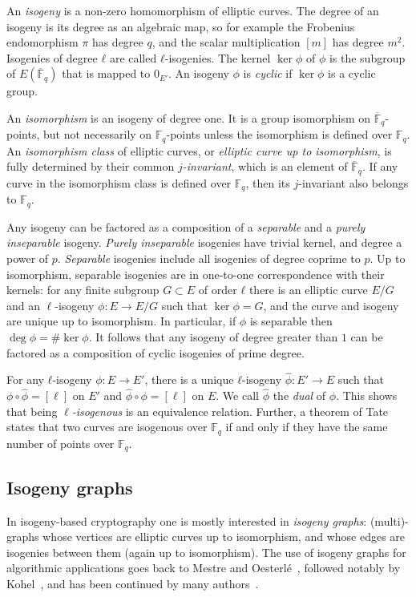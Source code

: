 \documentclass{llncs}
\newcommand{\F}{\mathbb{F}}
\newcommand{\Fbar}{\overline{\mathbb{F}}}
\begin{document}
An \emph{isogeny} is a non-zero homomorphism of elliptic curves.
The
degree of an isogeny is its degree as an algebraic map,
so for example the Frobenius endomorphism $\pi$ has degree $q$,
and the scalar multiplication $[m]$ has degree $m^2$.
Isogenies of degree $ℓ$ are called $ℓ$-isogenies.
The kernel $\ker ϕ$ of $\phi$
is the subgroup of $E(\Fbar_q)$ that is
mapped to $0_{E'}$. 
An isogeny $ϕ$ is \emph{cyclic} 
if $\ker ϕ$ is a cyclic group.

An \emph{isomorphism} is an isogeny of degree one. It is a
group isomorphism on $\Fbar_q$-points, but not necessarily on $\F_q$-points
unless the isomorphism is defined over $\F_q$. An \emph{isomorphism class}
of elliptic curves, or \emph{elliptic curve up to isomorphism}, is
fully determined by their common \emph{$j$-invariant}, which is an
element of $\Fbar_q$. If any curve in the isomorphism class is defined
over $\F_q$, then its $j$-invariant also belongs to $\F_q$.

Any isogeny can be factored as a composition of a \emph{separable} and
a \emph{purely inseparable} isogeny. \emph{Purely inseparable}
isogenies have trivial kernel, and degree a power of $p$.
\emph{Separable} isogenies include all
isogenies of degree coprime to $p$.
Up to isomorphism, separable isogenies
are in one-to-one correspondence with their kernels:
for any finite subgroup $G⊂E$ of order $ℓ$ there is 
an elliptic curve $E/G$ and an $\ell$-isogeny $\phi: E \to E/G$
such that $\ker \phi = G$,
and the curve and isogeny are unique up to isomorphism.
In particular, if $\phi$ is separable then $\deg ϕ=\#\ker ϕ$.
It follows
that any isogeny of degree greater than $1$ can be factored as a
composition of cyclic isogenies of prime degree.

For any $ℓ$-isogeny $ϕ:E→E'$, there is a unique $ℓ$-isogeny
$\hat{ϕ}:E'→E$ such that $ϕ∘\hat{ϕ} = [\ell]$ on $E'$
and $\hat{ϕ}∘ϕ = [\ell]$ on $E$.
We call $\hat{ϕ}$ the \emph{dual} of $ϕ$. This
shows that being \emph{$\ell$-isogenous} is an equivalence
relation. Further, a theorem of Tate states that two curves are
isogenous over $\F_q$ if and only if they have the same number of
points over $\F_q$.


\subsection{Isogeny graphs}
\label{sec:isogeny-graphs}

In isogeny-based cryptography one is mostly interested in
\emph{isogeny graphs}: (multi)-graphs whose vertices are
elliptic curves up to isomorphism, and whose edges are isogenies
between them (again up to isomorphism).
The use of isogeny graphs for algorithmic applications 
goes back to Mestre and Oesterlé~\cite{Mestre},
followed notably by Kohel~\cite{kohel},
and has been continued by many
authors~\cite{Gal,fouquet+morain02,GHS,MiretMSTV06,jao+miller+venkatesan09}.
\end{document}
